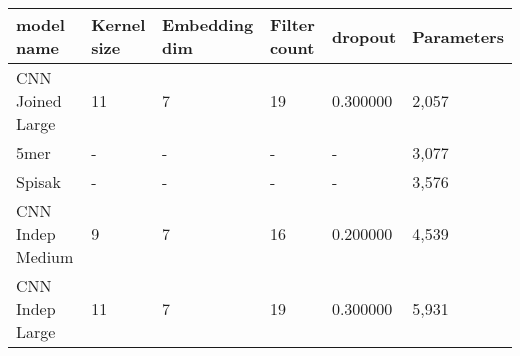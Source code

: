 \begin{tabular}{llllll}
\toprule
model name & Kernel size & Embedding dim & Filter count & dropout & Parameters \\
\midrule
CNN Joined Large & 11 & 7 & 19 & 0.300000 & 2,057 \\
5mer & - & - & - & - & 3,077 \\
Spisak & - & - & - & - & 3,576 \\
CNN Indep Medium & 9 & 7 & 16 & 0.200000 & 4,539 \\
CNN Indep Large & 11 & 7 & 19 & 0.300000 & 5,931 \\
\bottomrule
\end{tabular}
